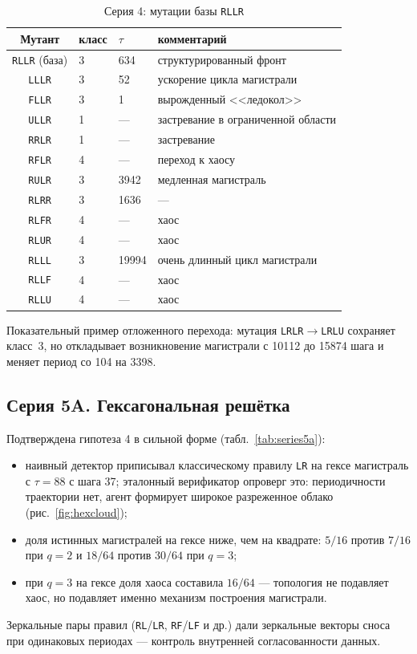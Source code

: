 \documentclass[12pt,a4paper]{article}
\begin{document}
	\begin{table}[H]
		\centering
		\caption{Серия 4: мутации базы \texttt{RLLR}}
		\label{tab:series4}
		\begin{tabular}{clll}
			\toprule
			Мутант & класс & $\tau$ & комментарий \\
			\midrule
			\texttt{RLLR} (база) & 3 & 634  & структурированный фронт \\
			\texttt{LLLR} & 3 & 52   & ускорение цикла магистрали \\
			\texttt{FLLR} & 3 & 1    & вырожденный <<ледокол>> \\
			\texttt{ULLR} & 1 & ---  & застревание в ограниченной области \\
			\texttt{RRLR} & 1 & ---  & застревание \\
			\texttt{RFLR} & 4 & ---  & переход к хаосу \\
			\texttt{RULR} & 3 & 3942 & медленная магистраль \\
			\texttt{RLRR} & 3 & 1636 & --- \\
			\texttt{RLFR} & 4 & ---  & хаос \\
			\texttt{RLUR} & 4 & ---  & хаос \\
			\texttt{RLLL} & 3 & 19994 & очень длинный цикл магистрали \\
			\texttt{RLLF} & 4 & ---  & хаос \\
			\texttt{RLLU} & 4 & ---  & хаос \\
			\bottomrule
		\end{tabular}
	\end{table}
	
	Показательный пример отложенного перехода: мутация \texttt{LRLR}$\to$\texttt{LRLU} сохраняет класс~3, но откладывает возникновение магистрали с 10112 до 15874 шага и меняет период со 104 на 3398.
	
	\subsection{Серия 5A. Гексагональная решётка}
	Подтверждена гипотеза 4 в сильной форме (табл.~\ref{tab:series5a}):
	\begin{itemize}
		\item наивный детектор приписывал классическому правилу \texttt{LR} на гексе магистраль с $\tau=88$ с шага 37; эталонный верификатор опроверг это: периодичности траектории нет, агент формирует широкое разреженное облако (рис.~\ref{fig:hexcloud});
		\item доля истинных магистралей на гексе ниже, чем на квадрате: $5/16$ против $7/16$ при $q=2$ и $18/64$ против $30/64$ при $q=3$;
		\item при $q=3$ на гексе доля хаоса составила $16/64$ --- топология не подавляет хаос, но подавляет именно механизм построения магистрали.
	\end{itemize}
	Зеркальные пары правил (\texttt{RL}/\texttt{LR}, \texttt{RF}/\texttt{LF} и др.) дали зеркальные векторы сноса при одинаковых периодах --- контроль внутренней согласованности данных.
	
\end{document}
